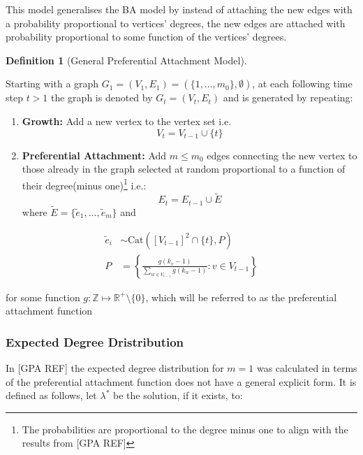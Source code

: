 \documentclass[
  10pt,
  a4paper,
]{scrreprt}
\providecommand{\tightlist}{%
  \setlength{\itemsep}{0pt}\setlength{\parskip}{0pt}}\usepackage{longtable,booktabs,array}
\theoremstyle{plain}
\theoremstyle{definition}
\newtheorem{definition}{Definition}[section]
\theoremstyle{remark}
\begin{document}
{This model generalises the BA model by instead of attaching the new
edges with a probability proportional to vertices' degrees, the new
edges are attached with probability proportional to some function of the
vertices' degrees.

\begin{definition}[General Preferential Attachment
Model]\protect\hypertarget{def-gpa}{}\label{def-gpa}

Starting with a graph
\(G_1 = (V_1, E_1) = (\{1,\ldots,m_0\}, \emptyset)\), at each following
time step \(t>1\) the graph is denoted by \(G_t = (V_t, E_t)\) and is
generated by repeating:

\begin{enumerate}
\def\labelenumi{\arabic{enumi}.}
\tightlist
\item
  \textbf{Growth:} Add a new vertex to the vertex set i.e. \[
  V_t = V_{t-1} \cup \{t\}
  \]
\item
  \textbf{Preferential Attachment:} Add \(m\le m_0\) edges connecting
  the new vertex to those already in the graph selected at random
  proportional to a function of their degree(minus one)\footnote{The
    probabilities are proportional to the degree minus one to align with
    the results from {[}GPA REF{]}} i.e.: \[
  E_t  = E_{t-1} \cup \tilde E
  \] where \(\tilde E = \{\tilde e_1,\ldots, \tilde e_m\}\) and
\end{enumerate}

\begin{align*}
\tilde e_i &\sim \text{Cat}\left([V_{t-1}]^2 \cap \{t\},P \right)\\
P &= \left\{\frac{g(k_v-1)}{\sum_{w\in V_{t-1}} g(k_w-1)} : v \in V_{t-1}\right\}
\end{align*}

for some function \(g: \mathbb Z \mapsto \mathbb R^+\setminus\{0\}\),
which will be referred to as the preferential attachment function

\end{definition}

\hypertarget{expected-degree-dristribution}{%
\subsubsection{Expected Degree
Dristribution}\label{expected-degree-dristribution}}

In {[}GPA REF{]} the expected degree distribution for \(m=1\) was
calculated in terms of the preferential attachment function does not
have a general explicit form. It is defined as follows, let
\(\lambda^*\) be the solution, if it exists, to:

}
\end{document}
